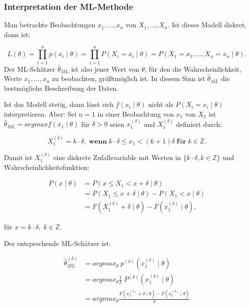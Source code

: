 \documentclass[10pt]{article}
\newcommand{\FZV}{X_1, \ldots, X_n} %
\newcommand{\xt}{x \mid \theta} %
\begin{document}
	\subsubsection{Interpretation der ML-Methode}
	Man betrachte Beobachtungen $x_1, \ldots , x_n$ von $\FZV$. Ist dieses Modell diskret, dann ist: 
	
	\begin{equation*}
		L(\theta)=\prod_{i=1}^{n} p(x_i \mid \theta) = \prod_{i=1}^{n} P (X_i = x_i \mid \theta) = P(X_1 = x_1, \ldots, X_n = x_n \mid \theta).
	\end{equation*}
	Der ML-Schätzer $\hat{\theta}_{ML}$ ist also jener Wert von $\theta$, für den die Wahrscheinlichkeit, Werte $x_1,\ldots,x_n$ zu beobachten, größtmöglich ist. In diesem Sinn ist $\hat{\theta}_{ML}$ die bestmögliche Beschreibung der Daten.
	
	Ist das Modell stetig, dann lässt sich $f(x_i \mid \theta)$ nicht als $P(X_i = x_i \mid \theta)$ interpretieren. Aber: Sei $n=1$ in einer Beobachtung von $x_1$ von $X_1$ ist $\hat{\theta}_{ML} = argmax f(x_1 \mid \theta)$ für $\delta > 0$ seien $x^{\left(\delta\right)}_1$ und $X^{\left(\delta\right)}_1$ definiert durch: 
	
	\begin{equation*}
		X^{\left(\delta\right)}_1 = k \cdot \delta, \;\textbf{wenn} \; k\cdot\delta \leq x_1 < (k+1)\delta \; \textbf{für} \; k \in \mathbb{Z}.
	\end{equation*}
	
	Damit ist $X^{\left(\delta\right)}_1$ eine diskrete Zufallsvariable mit Werten in $\{k\cdot\delta, k\in \mathbb{Z}\}$ und Wahrscheinlichkeitsfunktion:
	
	\begin{equation*}
		\begin{split}
			P(\xt) &= P (x\leq X_1 < x+ \delta \mid \theta) \\
			&= P (X_1 \leq x + \delta \mid \theta) - P (X_1 < x \mid \theta) \\
			&= F(X^{\left(\delta\right)}_1 + \delta \mid \theta) - F(x^{\left(\delta\right)}_1 \mid \theta),
		\end{split}
	\end{equation*}
	
	für $x = k \cdot \delta, \; k \in \mathbb{Z}$.
	
	Der entsprechende ML-Schätzer ist:
	
	\begin{equation*}
		\begin{split}
			\hat{\theta}_{ML}^{\left(\delta\right)} &= argmax_\theta \; p^{\left(\delta\right)} (x^{\left(\delta\right)}_1 \mid \theta)\\
			&= argmax_\theta \frac{1}{\delta} \; P^{\left(\delta\right)} (x^{\left(\delta\right)}_1 \mid \theta)\\
			&=argmax_\theta \frac{F(x^{\left(\delta\right)}_1 + \delta \mid \theta) - F(x^{\left(\delta\right)}_1 \mid \theta)}{\delta}
		\end{split}
	\end{equation*}
	
\end{document}
